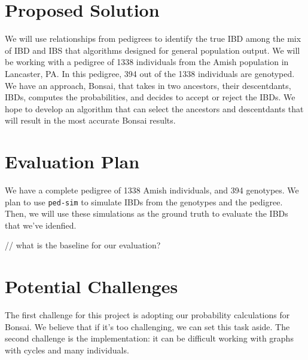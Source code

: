 \documentclass[12pt]{article}
\begin{document}

\section{Proposed Solution}

We will use relationships from pedigrees to identify the true IBD among the mix of IBD and IBS that algorithms designed for general population output. 
We will be working with a pedigree of 1338 individuals from the Amish population in Lancaster, PA. In this pedigree, 394 out of the 1338 individuals are genotyped\cite{Finke2021}. 
We have an approach, Bonsai\cite{Jewett2021}, that takes in two ancestors, their descentdants, IBDs, computes the probabilities, and decides to accept or reject the IBDs. We hope to develop an algorithm that can select the ancestors and descentdants that will result in the most accurate Bonsai results.


\section{Evaluation Plan}

We have a complete pedigree of 1338 Amish individuals, and 394 genotypes. We plan to use \texttt{ped-sim} to simulate IBDs from the genotypes and the pedigree. Then, we will use these simulations as the ground truth to evaluate the IBDs that we've idenfied.

// what is the baseline for our evaluation?

\section{Potential Challenges} The first challenge for this project is adopting our probability calculations for Bonsai. We believe that if it's too challenging, we can set this task aside. The second challenge is the implementation: it can be difficult working with graphs with cycles and many individuals.

\end{document}
